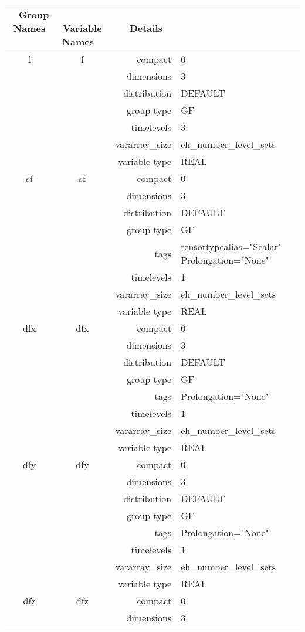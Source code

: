 \begin{tabular*}{150mm}{|c|c@{\extracolsep{\fill}}|rl|} \hline 
~ {\bf Group Names} ~ & ~ {\bf Variable Names} ~  &{\bf Details} ~ & ~\\ 
\hline 
f & f & compact & 0 \\ 
 &  & dimensions & 3 \\ 
 &  & distribution & DEFAULT \\ 
 &  & group type & GF \\ 
 &  & timelevels & 3 \\ 
 &  & vararray\_size & eh\_number\_level\_sets \\ 
 &  & variable type & REAL \\ 
\hline 
sf & sf & compact & 0 \\ 
 &  & dimensions & 3 \\ 
 &  & distribution & DEFAULT \\ 
 &  & group type & GF \\ 
 &  & tags & tensortypealias="Scalar" Prolongation="None" \\ 
 &  & timelevels & 1 \\ 
 &  & vararray\_size & eh\_number\_level\_sets \\ 
 &  & variable type & REAL \\ 
\hline 
dfx & dfx & compact & 0 \\ 
 &  & dimensions & 3 \\ 
 &  & distribution & DEFAULT \\ 
 &  & group type & GF \\ 
 &  & tags & Prolongation="None" \\ 
 &  & timelevels & 1 \\ 
 &  & vararray\_size & eh\_number\_level\_sets \\ 
 &  & variable type & REAL \\ 
\hline 
dfy & dfy & compact & 0 \\ 
 &  & dimensions & 3 \\ 
 &  & distribution & DEFAULT \\ 
 &  & group type & GF \\ 
 &  & tags & Prolongation="None" \\ 
 &  & timelevels & 1 \\ 
 &  & vararray\_size & eh\_number\_level\_sets \\ 
 &  & variable type & REAL \\ 
\hline 
dfz & dfz & compact & 0 \\ 
 &  & dimensions & 3 \\ 

\end{tabular*}
